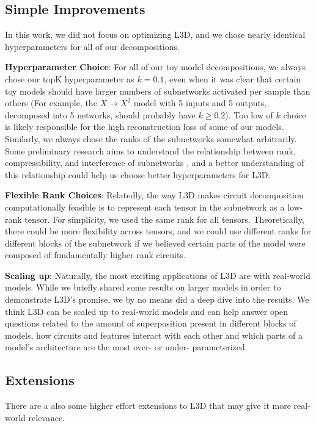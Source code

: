 \documentclass{article}
\theoremstyle{plain}
\theoremstyle{definition}
\theoremstyle{remark}
\begin{document}
\subsection{Simple Improvements}
In this work, we did not focus on optimizing L3D, and we chose nearly identical hyperparameters for all of our decompositions. 

\textbf{Hyperparameter Choice}: For all of our toy model decompositions, we always chose our $\text{topK}$ hyperparameter as $k=0.1$, even when it was clear that certain toy models should have larger numbers of subnetworks activated per sample than others (For example, the $X \rightarrow X^2$ model with 5 inputs and 5 outputs, decomposed into 5 networks, should probably have $k \geq 0.2$). Too low of $k$ choice is likely responsible for the high reconstruction loss of some of our models. Similarly, we always chose the ranks of the subnetworks somewhat arbitrarily. Some preliminary research aims to understand the relationship between rank, compressibility, and interference of subnetworks \cite{hanni2024mathematical,bushnaq2024circuits}, and a better understanding of this relationship could help us choose better hyperparameters for L3D. 

\textbf{Flexible Rank Choices}: Relatedly, the way L3D makes circuit decomposition computationally feasible is to represent each tensor in the subnetwork as a low-rank tensor. For simplicity, we used the same rank for all tensors. Theoretically, there could be more flexibility across tensors, and we could use different ranks for different blocks of the subnetwork if we believed certain parts of the model were composed of fundamentally higher rank circuits. 

\textbf{Scaling up}: Naturally, the most exciting applications of L3D are with real-world models. While we briefly shared some results on larger models in order to demonstrate L3D's promise, we by no means did a deep dive into the results. We think L3D can be scaled up to real-world models and can help answer open questions related to the amount of superposition present in different blocks of models, how circuits and features interact with each other and which parts of a model's architecture are the most over- or under- parameterized. 

\subsection{Extensions}\label{subsec:extensions}

There are a also some higher effort extensions to L3D that may give it more real-world relevance. 
\end{document}
